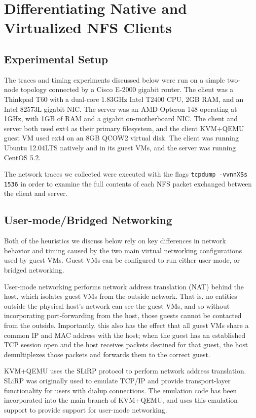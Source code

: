 \documentclass[11pt,pdftex,twocolumn]{article}
\begin{document}
\section{Differentiating Native and Virtualized NFS Clients}
\label{sec:NFS}

\subsection{Experimental Setup}
\label{subsec:expSetup}
The traces and timing experiments discussed below were run on a simple two-node topology connected by a Cisco E-2000 gigabit router. The client was a Thinkpad T60 with a dual-core 1.83GHz Intel T2400 CPU, 2GB RAM, and an Intel 82573L gigabit NIC. The server was an AMD Opteron 148 operating at 1GHz, with 1GB of RAM and a gigabit on-motherboard NIC. The client and server both used ext4 as their primary filesystem, and the client KVM+QEMU guest VM used ext4 on an 8GB QCOW2 virtual disk. The client was running Ubuntu 12.04LTS natively and in its guest VMs, and the server was running CentOS 5.2.

The network traces we collected were executed with the flags \texttt{tcpdump -vvnnXSs 1536} in order to examine the full contents of each NFS packet exchanged between the client and server.

\subsection{User-mode/Bridged Networking}
\label{subsec:networkIntro}
Both of the heuristics we discuss below rely on key differences in network behavior and timing caused by the two main virtual networking configurations used by guest VMs. Guest VMs can be configured to run either user-mode, or bridged networking.

User-mode networking performs network address translation (NAT) behind the host, which isolates guest VMs from the outside network. That is, no entities outside the physical host's network can see the guest VMs, and so without incorporating port-forwarding from the host, those guests cannot be contacted from the outside. Importantly, this also has the effect that all guest VMs share a common IP and MAC address with the host; when the guest has an established TCP session open and the host receives packets destined for that guest, the host demultiplexes those packets and forwards them to the correct guest. 

KVM+QEMU uses the SLiRP protocol to perform network address translation. SLiRP was originally used to emulate TCP/IP and provide transport-layer functionality for users with dialup connections. The emulation code has been incorporated into the main branch of KVM+QEMU, and uses this emulation support to provide support for user-mode networking.
\end{document}
